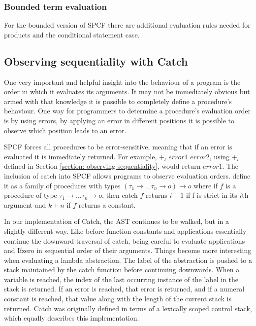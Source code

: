 \documentclass[12pt,a4paper]{report}
\theoremstyle{definition}
\theoremstyle{remark}
\begin{document}
\subsubsection{Bounded term evaluation}
For the bounded version of SPCF there are additional evaluation rules needed for products and the conditional statement case. 

\subsection{Observing sequentiality with Catch}\label{section: catch}
One very important and helpful insight into the behaviour of a program is the order in which it evaluates its arguments. It may not be immediately obvious but armed with that knowledge it is possible to completely define a procedure's behaviour. One way for programmers to determine a procedure's evaluation order is by using errors, by applying an error in different positions it is possible to observe which position leads to an error.

SPCF forces all procedures to be error-sensitive, meaning that if an error is evaluated it is immediately returned. For example, $+_l$ $error1$ $error2$, using $+_l$ defined in Section \ref{section: observing sequentiality}, would return $error1$. The inclusion of catch into SPCF allows programs to observe evaluation orders. \cite{cartwright_1992} define it as a family of procedures with types $(\tau_1 \rightarrow \dots \tau_n \rightarrow o) \rightarrow o$ where if $f$ is a procedure of type $\tau_1 \rightarrow \dots \tau_n \rightarrow o$, then catch $f$ returns $i - 1$ if f is strict in its $i$th argument and $k+n$ if $f$ returns a constant. 

In our implementation of Catch, the AST continues to be walked, but in a slightly different way. Like before function constants and applications essentially continue the downward traversal of catch, being careful to evaluate applications and Ifzero in sequential order of their arguments. Things become more interesting when evaluating a lambda abstraction. The label of the abstraction is pushed to a stack maintained by the catch function before continuing downwards. When a variable is reached, the index of the last occurring instance of the label in the stack is returned. If an error is reached, that error is returned, and if a numeral constant is reached,  that value along with the length of the current stack is returned. Catch was originally defined in terms of a lexically scoped control stack, which equally describes this implementation.
\end{document}
